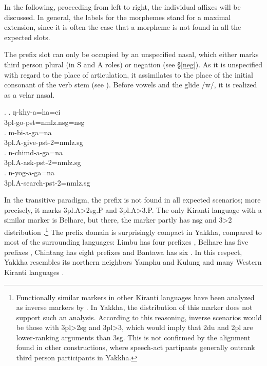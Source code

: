 In the following, proceeding from left to right, the individual affixes  will be discussed. In general, the labels for the morphemes stand for a maximal extension, since  it is often the case that a morpheme is not found in all the expected slots.

The prefix slot can only be occupied by an unspecified nasal, which either marks third person plural (in S and A roles) or negation (see §\ref{neg}). As it is unspecified with regard to the place of articulation, it assimilates to the place of the initial consonant of the verb stem (see \Next). Before vowels and the glide /w/, it is realized as a velar nasal. 

\ex. \ag. ŋ-khy-a=ha=ci\\
		{\sc 3pl}-go-{\sc pst=nmlz.nsg=nsg}\\
	\bg. m-bi-a-ga=na\\
	{\sc 3pl.A}-give{\sc -pst-2=nmlz.sg}\\
\bg. n-chimd-a-ga=na\\
	{\sc 3pl.A}-ask{\sc -pst-2=nmlz.sg}\\
 \bg. n-yog-a-ga=na\\
	{\sc 3pl.A}-search{\sc -pst-2=nmlz.sg}\\
 
In the transitive paradigm, the prefix is not found in all expected scenarios; more precisely, it  marks {\sc 3pl.A>2sg.P} and {\sc 3pl.A>3.P}. The only Kiranti language with a similar marker is Belhare, but there, the marker partly has {\sc nsg} and 3>2 distribution \citep[551]{Bickel2003Belhare}.\footnote{Functionally similar  markers in other Kiranti languages have been analyzed as inverse markers by \citet{Ebert1991Inverse}. In Yakkha, the distribution of this marker does not support such an analysis. According to this reasoning, inverse scenarios would be those with {\sc 3pl>2sg} and {\sc 3pl>3}, which would imply that {\sc 2du} and {\sc 2pl} are lower-ranking arguments than {\sc 3sg}. This is not confirmed by the alignment found in other constructions, where speech-act partipants generally outrank third person participants in Yakkha.} The prefix domain is surprisingly compact in Yakkha, compared to most of the surrounding languages: Limbu has four prefixes \citep{Driem1997A-new-analysis}, Belhare has five prefixes \citep{Bickel2003Belhare}, Chintang has eight prefixes \citep{Schikowski2012_Morphology} and Bantawa has six \citep{Doornenbal2009A-grammar}. In this respect, Yakkha resembles its northern neighbors  Yamphu and Kulung \citep{Rutgers1998Yamphu, Tolsma1999A-grammar} and many Western Kiranti languages \citep[93]{Jacques2012_Agreement}. 

